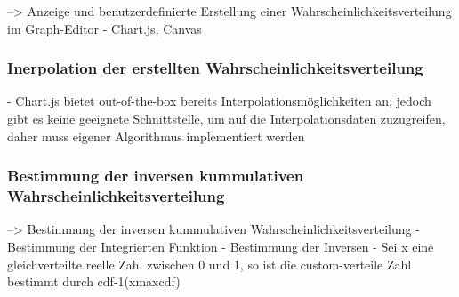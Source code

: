 --> Anzeige und benutzerdefinierte Erstellung einer Wahrscheinlichkeitsverteilung im Graph-Editor
- Chart.js, Canvas

\subsubsection{Inerpolation der erstellten Wahrscheinlichkeitsverteilung}

- Chart.js bietet out-of-the-box bereits Interpolationsmöglichkeiten an, jedoch gibt es keine geeignete Schnittstelle, um auf die Interpolationsdaten zuzugreifen, daher muss eigener Algorithmus implementiert werden

\subsubsection{Bestimmung der inversen kummulativen Wahrscheinlichkeitsverteilung}
--> Bestimmung der inversen kummulativen Wahrscheinlichkeitsverteilung
- Bestimmung der Integrierten Funktion
- Bestimmung der Inversen
- Sei x eine gleichverteilte reelle Zahl zwischen 0 und 1, so ist die custom-verteile Zahl bestimmt durch cdf-1(xmaxcdf)